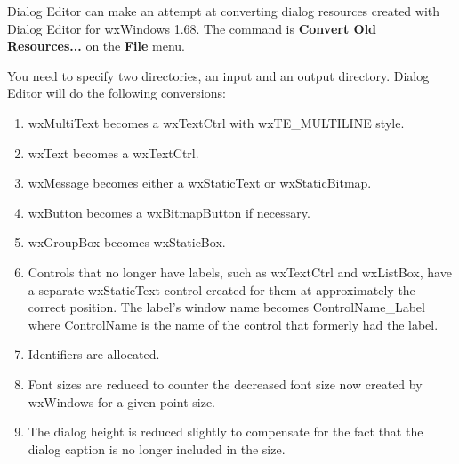 Dialog Editor can make an attempt at converting dialog resources created with Dialog Editor for wxWindows 1.68.
The command is {\bf Convert Old Resources...} on the {\bf File} menu.

You need to specify two directories, an input and an output directory. Dialog Editor will
do the following conversions:

\begin{enumerate}\itemsep=0pt
\item wxMultiText becomes a wxTextCtrl with wxTE\_MULTILINE style.
\item wxText becomes a wxTextCtrl.
\item wxMessage becomes either a wxStaticText or wxStaticBitmap.
\item wxButton becomes a wxBitmapButton if necessary.
\item wxGroupBox becomes wxStaticBox.
\item Controls that no longer have labels, such as wxTextCtrl and wxListBox,
have a separate wxStaticText control created for them at approximately the correct
position. The label's window name becomes ControlName_Label where ControlName is
the name of the control that formerly had the label.
\item Identifiers are allocated.
\item Font sizes are reduced to counter the decreased font size now created by wxWindows
for a given point size.
\item The dialog height is reduced slightly to compensate for the fact that the dialog caption
is no longer included in the size.
\end{enumerate}

